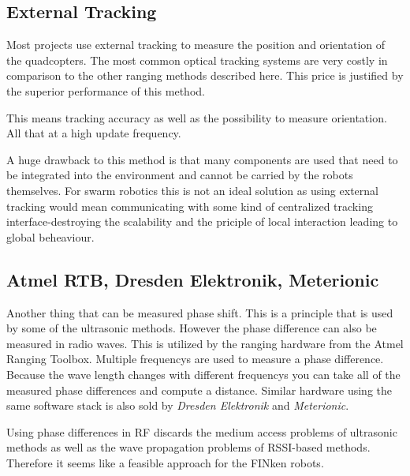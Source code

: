 \subsection{External Tracking}

Most projects use external tracking to measure the position and orientation of the quadcopters. 
The most common optical tracking systems are very costly in comparison to the other ranging methods described here.
This price is justified by the superior performance of this method.

This means tracking accuracy as well as the possibility to measure orientation.
All that at a high update frequency.


A huge drawback to this method is that many components are used that need to be integrated into the environment and cannot be carried by the robots themselves.
For swarm robotics this is not an ideal solution as using external tracking would mean communicating with some kind of centralized tracking interface-destroying the scalability and the priciple of local interaction leading to global beheaviour.
\subsection{Atmel RTB, Dresden Elektronik, Meterionic}

Another thing that can be measured phase shift.
This is a principle that is used by some of the ultrasonic methods.
However the phase difference can also be measured in radio waves.
This is utilized by the ranging hardware from the Atmel Ranging Toolbox.
Multiple frequencys are used to measure a phase difference.
Because the wave length changes with different frequencys you can take all of the measured phase differences and compute a distance.
Similar hardware using the same software stack is also sold by \emph{Dresden Elektronik} and \emph{Meterionic}.

Using phase differences in RF discards the medium access problems of ultrasonic methods as well as the wave propagation problems of RSSI-based methods.
Therefore it seems like a feasible approach for the FINken robots.


